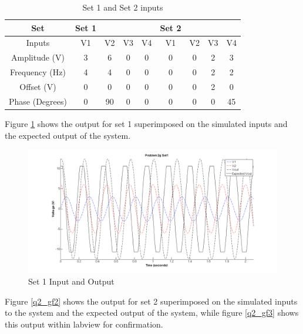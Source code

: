 \documentclass{article}
\theoremstyle{plain}
\theoremstyle{definition}
\theoremstyle{remark}
\begin{document}
\begin{table}
\begin{center}
    \begin{tabular}{|c|c|c|c|c|c|c|c|c|}
        \hline
        Set       & Set 1 & ~  & ~  & ~  & Set 2 & ~  & ~  & ~  \\ \hline
        Inputs    & V1    & V2 & V3 & V4 & V1    & V2 & V3 & V4 \\ 
        Amplitude (V) & 3     & 6  & 0  & 0  & 0     & 0  & 2  & 3  \\ 
        Frequency (Hz) & 4     & 4  & 0  & 0  & 0     & 0  & 2  & 2  \\ 
        Offset    (V) & 0     & 0  & 0  & 0  & 0     & 0  & 2  & 0  \\ 
        Phase     (Degrees) & 0     & 90 & 0  & 0  & 0     & 0  & 0  & 45 \\
        \hline
    \end{tabular}
\end{center}
\caption{Set 1 and Set 2 inputs}
\label{q2_gt1}
\end{table}

Figure \ref{q2_gf1} shows the output for set 1 superimposed on the simulated inputs and the expected output of the system.  

\begin{figure}[h]
\begin{center}
\includegraphics[width = 15cm]{problem2g_set1.png}
\caption{Set 1 Input and Output}
\label{q2_gf1}
\end{center}
\end{figure}

Figure \ref{q2_gf2} shows the output for set 2 superimposed on the simulated inputs to the system and the expected output of the system, while figure \ref{q2_gf3} shows this output within labview for confirmation.
\end{document}

